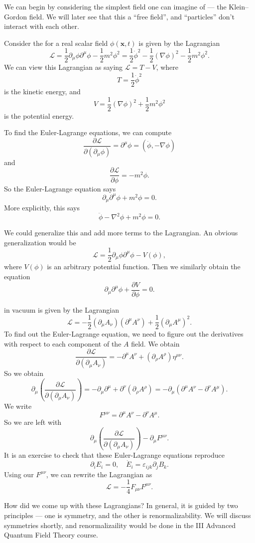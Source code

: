 \documentclass[a4paper]{article}
\begin{document}
We can begin by considering the simplest field one can imagine of --- the Klein--Gordon field. We will later see that this a ``free field'', and ``particles'' don't interact with each other.

\begin{eg}
  Consider the  for a real scalar field $\phi(\mathbf{x}, t)$ is given by the Lagrangian
  \[
    \mathcal{L} = \frac{1}{2} \partial_\mu \phi \partial^\mu \phi - \frac{1}{2}m^2 \phi^2 = \frac{1}{2} \dot{\phi}^2 - \frac{1}{2} (\nabla \phi)^2 - \frac{1}{2} m^2 \phi^2.
  \]
  We can view this Lagrangian as saying $\mathcal{L} = T - V$, where
  \[
    T = \frac{1}{2} \dot{\phi}^2
  \]
  is the kinetic energy, and
  \[
    V = \frac{1}{2} (\nabla \phi)^2 + \frac{1}{2}m^2 \phi^2
  \]
  is the potential energy.

  To find the Euler-Lagrange equations, we can compute
  \[
    \frac{\partial \mathcal{L}}{\partial(\partial_\mu \phi)} = \partial^\mu \phi = (\dot{\phi}, -\nabla \phi)
  \]
  and
  \[
    \frac{\partial \mathcal{L}}{\partial \phi} = -m^2 \phi.
  \]
  So the Euler-Lagrange equation says
  \[
    \partial_\mu \partial^\mu \phi + m^2 \phi = 0.
  \]
  More explicitly, this says
  \[
    \ddot{\phi} - \nabla^2 \phi + m^2 \phi = 0.
  \]
\end{eg}
We could generalize this and add more terms to the Lagrangian. An obvious generalization would be
\[
  \mathcal{L} = \frac{1}{2} \partial_\mu \phi \partial^\mu \phi - V(\phi),
\]
where $V(\phi)$ is an arbitrary potential function. Then we similarly obtain the equation
\[
  \partial_\mu \partial^\mu \phi + \frac{\partial V}{\partial \phi} = 0.
\]

\begin{eg}
   in vacuum is given by the Lagrangian
  \[
    \mathcal{L} = -\frac{1}{2} (\partial_\mu A_\nu)(\partial^\mu A^\nu) + \frac{1}{2}(\partial_\mu A^\mu)^2.
  \]
  To find out the Euler-Lagrange equation, we need to figure out the derivatives with respect to each component of the $A$ field. We obtain
  \[
    \frac{\partial \mathcal{L}}{\partial(\partial_\mu A_\nu)} = -\partial^\mu A^\nu + (\partial_\rho A^\rho) \eta^{\mu\nu}.
  \]
  So we obtain
  \[
    \partial_\mu \left(\frac{\partial \mathcal{L}}{\partial(\partial_\mu A_\nu)}\right) = - \partial_\mu\partial^\mu + \partial^\nu (\partial_\rho A^\rho) = - \partial_\mu (\partial^\mu A^\nu - \partial^\nu A^\mu).
  \]
  We write
  \[
    F^{\mu\nu} = \partial^\mu A^\nu - \partial^\nu A^\mu.
  \]
  So we are left with
  \[
    \partial_\mu \left(\frac{\partial \mathcal{L}}{\partial(\partial_\mu A_\nu)}\right) -\partial_\mu F^{\mu\nu}.
  \]
  It is an exercise to check that these Euler-Lagrange equations reproduce
  \[
    \partial_i E_i = 0,\quad \dot{E}_i = \varepsilon_{ijk} \partial_j B_k.
  \]
  Using our $F^{\mu\nu}$, we can rewrite the Lagrangian as
  \[
    \mathcal{L} = -\frac{1}{4} F_{\mu\nu}F^{\mu\nu}.
  \]
\end{eg}
How did we come up with these Lagrangians? In general, it is guided by two principles --- one is symmetry, and the other is renormalizability. We will discuss symmetries shortly, and renormalizaility would be done in the III Advanced Quantum Field Theory course.
\end{document}
